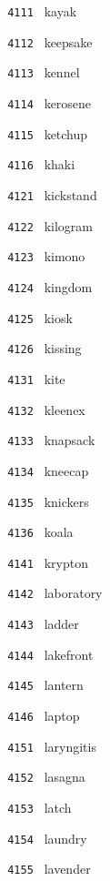 \documentclass[11pt]{article}
\begin{document}
\begin{multicols}{6}
\footnotesize
\noindent \texttt{ 4111 } kayak  \par
\noindent \texttt{ 4112 } keepsake  \par
\noindent \texttt{ 4113 } kennel  \par
\noindent \texttt{ 4114 } kerosene  \par
\noindent \texttt{ 4115 } ketchup  \par
\noindent \texttt{ 4116 } khaki  \par
\vspace{3mm}
\noindent \texttt{ 4121 } kickstand  \par
\noindent \texttt{ 4122 } kilogram  \par
\noindent \texttt{ 4123 } kimono  \par
\noindent \texttt{ 4124 } kingdom  \par
\noindent \texttt{ 4125 } kiosk  \par
\noindent \texttt{ 4126 } kissing  \par
\vspace{3mm}
\noindent \texttt{ 4131 } kite  \par
\noindent \texttt{ 4132 } kleenex  \par
\noindent \texttt{ 4133 } knapsack  \par
\noindent \texttt{ 4134 } kneecap  \par
\noindent \texttt{ 4135 } knickers  \par
\noindent \texttt{ 4136 } koala  \par
\vspace{3mm}
\noindent \texttt{ 4141 } krypton  \par
\noindent \texttt{ 4142 } laboratory  \par
\noindent \texttt{ 4143 } ladder  \par
\noindent \texttt{ 4144 } lakefront  \par
\noindent \texttt{ 4145 } lantern  \par
\noindent \texttt{ 4146 } laptop  \par
\vspace{3mm}
\noindent \texttt{ 4151 } laryngitis  \par
\noindent \texttt{ 4152 } lasagna  \par
\noindent \texttt{ 4153 } latch  \par
\noindent \texttt{ 4154 } laundry  \par
\noindent \texttt{ 4155 } lavender  \par

\end{multicols}
\end{document}
